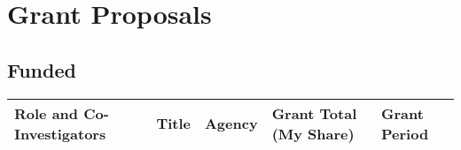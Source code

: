 \section*{Grant Proposals}

\subsection*{Funded}%

\ifdefined\iscockrell
{\footnotesize
  \begin{center}
    \begin{longtable}{p{1.7cm}p{6.5cm}p{3cm}P{1.5cm}p{1.0cm}}
      \centering\textbf{Role and} \newline \textbf{Co-Investigators}  & \centering\textbf{Title} & \centering\textbf{Agency} & \centering\textbf{Grant Total} \newline \textbf{(My Share)} & \textbf{Grant Period} \\
      \midrule
      
      \bottomrule
    \end{longtable}
  \end{center}
}
\else
\ifdefined\ispdf
